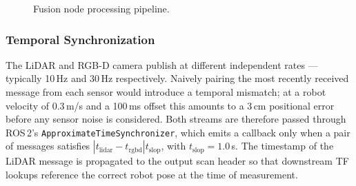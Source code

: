 \begin{figure}[H]
\centering
{}
\caption{Fusion node processing pipeline.}
\label{fig:fusion_pipeline}
\end{figure}

\subsubsection{Temporal Synchronization}

The LiDAR and RGB-D camera publish at different independent rates —
typically 10\,Hz and 30\,Hz respectively. Naively pairing the most
recently received message from each sensor would introduce a temporal
mismatch; at a robot velocity of 0.3\,m/s and a 100\,ms offset this
amounts to a 3\,cm positional error before any sensor noise is
considered. Both streams are therefore passed through ROS\,2's
\texttt{ApproximateTimeSynchronizer}, which emits a callback only when
a pair of messages satisfies $|t_{\text{lidar}} - t_{\text{rgbd}}| 
t_{\text{slop}}$, with $t_{\text{slop}} = 1.0$\,s. The timestamp of
the LiDAR message is propagated to the output scan header so that
downstream TF lookups reference the correct robot pose at the time of
measurement.

